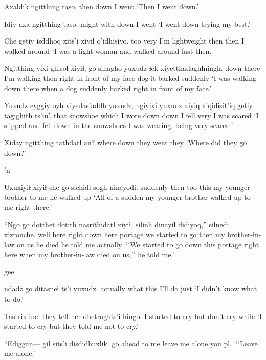 \documentclass[12pt]{article}
\begin{document}
\gll Axaɬdik ngitthing taso.
then    down {I went}
\glt `Then I went down.'
\glend

\gll Idiy axa ngitthing taso. 
might with down {I went}
\glt `I went down trying my best.'
\glend

\gll Che getiy isddhoq xits'i xiyiɬ q'idhisiyo. 
too very  {I'm lightweight} then then {I walked around}
\glt `I was a light woman and walked around fast then.
\glend

\gll Ngitthing yixi  ghisoɬ      xiyiɬ,   go    sinagho             yuxudz ɬek xiyetthadaghɬningh. 
down      there {I'm walking} then  right {in front of my face} {}   dog {it barked suddenly}
\glt `I was walking down there when a dog suddenly barked right in front of my face.'
\glend

\gll Yuxudz eyggiy oyh viyedas'addh yuxudz, ngiyixi yuxudz xiyiq {xiqidisit'iq} getiy tagighith ts'in'. 
{}       that   snowshoe {which I wore} {}  down    {}  down   { I fell}                      very  {I was scared}
\glt `I slipped and fell down in the snowshoes I was wearing, being very scared.'
\glend

\gll Xiday ngitthing tathdatl an?
where down    {they went} they
\glt `Where did they go down?'
\glend

'n

\gll Uxuxiyiɬ xiyiɬ che go sichidl sogh nineyodi.
suddenly then too this {my younger brother} {to me} {he walked up}
\glt `All of a sudden my younger brother walked up to me right there.'
\glend

\gll ``Ngo go dotthet dotith nasrithidatl xiyiɬ, silinh dinayiɬ didiyoq,'' siɬnedi xizronche.
well here {right down here} portage {we started to go} then {my brother-in-law} {on us} {he died} {he told me} actually
\glt ```We started to go down this portage right here when my brother-in-law died on us,'' he told me.'
\glend

gee

  ndadz go ditasneɬ ts'i yuxudz.
actually          what  this {I'll do} {} just
\glt `I didn't know what to do.'
\glend

\gll Tastrix ine' {they tell her} dhetraghts'i hingo.
{{I started to cry}} but {} {don't cry} while
\glt `I started to cry but they told me not to cry.'
\glend

\gll ``Ediggan--- gil sits'i disdidhuxlik. 
{}    {go ahead} {to me}   {leave me alone you pl.} 
\glt ```Leave me alone.' 
\glend
\end{document}
